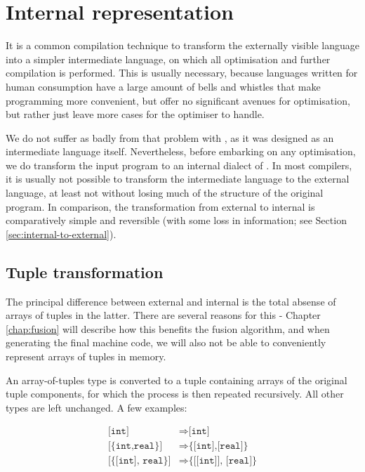 \chapter{Internal representation}
\label{chap:internal}

It is a common compilation technique to transform the externally
visible language into a simpler intermediate language, on which all
optimisation and further compilation is performed.  This is usually
necessary, because languages written for human consumption have a
large amount of bells and whistles that make programming more
convenient, but offer no significant avenues for optimisation, but
rather just leave more cases for the optimiser to handle.

We do not suffer as badly from that problem with \LO{}, as it was
designed as an intermediate language itself.  Nevertheless, before
embarking on any optimisation, we do transform the input program to an
internal dialect of \LO{}.  In most compilers, it is usually not
possible to transform the intermediate language to the external
language, at least not without losing much of the structure of the
original program.  In comparison, the transformation from external to
internal \LO{} is comparatively simple and reversible (with some loss
in information; see Section \ref{sec:internal-to-external}).

\section{Tuple transformation}
\label{sec:tuple-transformation}

The principal difference between external and internal \LO{} is the
total absense of arrays of tuples in the latter.  There are several
reasons for this - Chapter \ref{chap:fusion} will describe how this
benefits the fusion algorithm, and when generating the final machine
code, we will also not be able to conveniently represent arrays of
tuples in memory.

An array-of-tuples type is converted to a tuple containing arrays of
the original tuple components, for which the process is then repeated
recursively.  All other types are left unchanged.  A few examples:

\begin{align*}
\texttt{[int]} &\Rightarrow \texttt{[int]} \\
\texttt{[\{int,real\}]} &\Rightarrow \texttt{\{[int],[real]\}} \\
\texttt{[\{[int], real\}]} &\Rightarrow \texttt{\{[[int]], [real]\}} \\
\end{align*}

